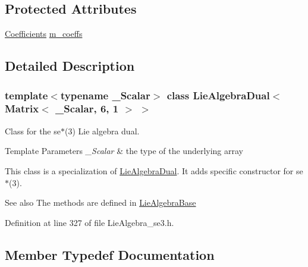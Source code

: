 \subsection*{Protected Attributes}
\begin{DoxyCompactItemize}
\item 
\hyperlink{class_lie_algebra_dual_3_01_matrix_3_01___scalar_00_016_00_011_01_4_01_4_ae22cd667e4ac77db27cc018db14003bd}{Coefficients} \hyperlink{class_lie_algebra_dual_3_01_matrix_3_01___scalar_00_016_00_011_01_4_01_4_aa6732bb98b628f1d58e95e50f4596b49}{m\+\_\+coeffs}
\end{DoxyCompactItemize}


\subsection{Detailed Description}
\subsubsection*{template$<$typename \+\_\+\+Scalar$>$\newline
class Lie\+Algebra\+Dual$<$ Matrix$<$ \+\_\+\+Scalar, 6, 1 $>$ $>$}

Class for the se$\ast$(3) Lie algebra dual. 


\begin{DoxyTemplParams}{Template Parameters}
{\em \+\_\+\+Scalar} & the type of the underlying array\\
\hline
\end{DoxyTemplParams}
This class is a specialization of \hyperlink{class_lie_algebra_dual}{Lie\+Algebra\+Dual}. It adds specific constructor for se$\ast$(3).

\begin{DoxySeeAlso}{See also}
The methods are defined in \hyperlink{class_lie_algebra_base}{Lie\+Algebra\+Base} 
\end{DoxySeeAlso}


Definition at line 327 of file Lie\+Algebra\+\_\+se3.\+h.



\subsection{Member Typedef Documentation}
\hypertarget{class_lie_algebra_dual_3_01_matrix_3_01___scalar_00_016_00_011_01_4_01_4_a45aa12118237d9a3de26fc61791f31bf}{}\label{class_lie_algebra_dual_3_01_matrix_3_01___scalar_00_016_00_011_01_4_01_4_a45aa12118237d9a3de26fc61791f31bf} 
